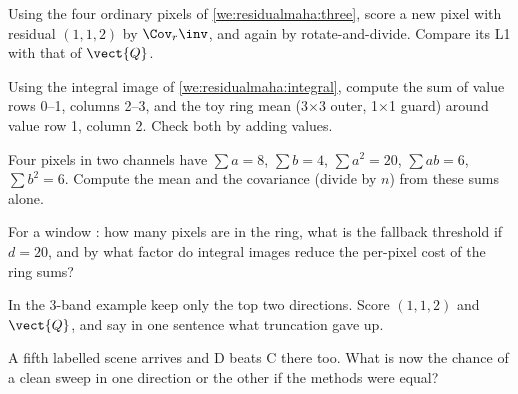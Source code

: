 \begin{checkyourself}
\item\label{ex:residualmaha:1} Using the four ordinary pixels of \cref{we:residualmaha:three}, score a new pixel
  with residual $(1,1,2)$ by $\Cov_r\inv$, and again by rotate-and-divide. Compare its L1 with that of
  $\vect{Q}$.
\item\label{ex:residualmaha:2} Using the integral image of \cref{we:residualmaha:integral}, compute the sum of
  value rows 0--1, columns 2--3, and the toy ring mean (3$\times$3 outer, 1$\times$1 guard) around value row 1,
  column 2. Check both by adding values.
\item\label{ex:residualmaha:3} Four pixels in two channels have $\sum a=8$, $\sum b=4$, $\sum a^2=20$,
  $\sum ab=6$, $\sum b^2=6$. Compute the mean and the covariance (divide by $n$) from these sums alone.
\item\label{ex:residualmaha:4} For a window : how many pixels are in the ring, what is the
  fallback threshold if $d=20$, and by what factor do integral images reduce the per-pixel cost of the ring
  sums?
\item\label{ex:residualmaha:5} In the 3-band example keep only the top two directions. Score $(1,1,2)$ and
  $\vect{Q}$, and say in one sentence what truncation gave up.
\item\label{ex:residualmaha:6} A fifth labelled scene arrives and D beats C there too. What is now the chance
  of a clean sweep in one direction or the other if the methods were equal?
\end{checkyourself}

